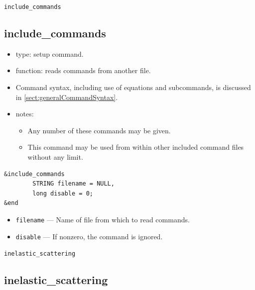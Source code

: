 \documentclass[11pt]{article}
\begin{document}
\newpage
\begin{center}{\Large\verb|include_commands|}\end{center}
\subsection{include\_commands \label{subsec:includecommands}}

\begin{itemize}
\item type: setup command.
\item function: reads commands from another file.
\item Command syntax, including use of equations and subcommands, is discussed in \ref{sect:generalCommandSyntax}.
\item notes: 
	\begin{itemize}
	\item Any number of these commands may be given.
        \item This command may be used from within other included command files without any limit.
	\end{itemize}
\end{itemize}

\begin{verbatim}
&include_commands
        STRING filename = NULL,
        long disable = 0;
&end
\end{verbatim}

\begin{itemize}
\item \verb|filename| --- Name of file from which to read commands.
\item \verb|disable| --- If nonzero, the command is ignored.
\end{itemize}

\newpage
\begin{center}{\Large\verb|inelastic_scattering|}\end{center}
\subsection{inelastic\_scattering \label{subsec:inelasticscattering}}
\end{document}
